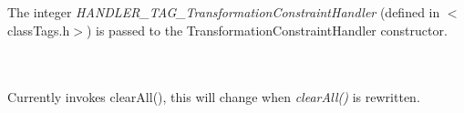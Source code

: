  \\
\\ 
The integer {\em HANDLER\_TAG\_TransformationConstraintHandler} (defined in
$<$classTags.h$>$) is passed to the TransformationConstraintHandler
constructor. 

 \\
\\ 
Currently invokes clearAll(), this will change when {\em
clearAll()} is rewritten. \\

\\
 \\
